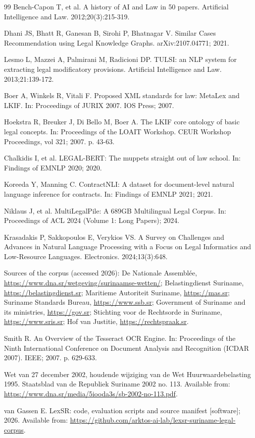 \documentclass{IOS-Book-Article}
\begin{document}
\begin{thebibliography}{99}
Bench-Capon T, et al. A history of AI and Law in 50 papers. Artificial Intelligence and Law.
2012;20(3):215-319.

Dhani JS, Bhatt R, Ganesan B, Sirohi P, Bhatnagar V. Similar Cases Recommendation using Legal
Knowledge Graphs. arXiv:2107.04771; 2021.

Lesmo L, Mazzei A, Palmirani M, Radicioni DP. TULSI: an NLP system for extracting legal
modificatory provisions. Artificial Intelligence and Law. 2013;21:139-172.

Boer A, Winkels R, Vitali F. Proposed XML standards for law: MetaLex and LKIF. In:
Proceedings of JURIX 2007. IOS Press; 2007.

Hoekstra R, Breuker J, Di Bello M, Boer A. The LKIF core ontology of basic legal concepts. In:
Proceedings of the LOAIT Workshop. CEUR Workshop Proceedings, vol 321; 2007. p. 43-63.

Chalkidis I, et al. LEGAL-BERT: The muppets straight out of law school. In: Findings of
EMNLP 2020; 2020.

Koreeda Y, Manning C. ContractNLI: A dataset for document-level natural language inference
for contracts. In: Findings of EMNLP 2021; 2021.

Niklaus J, et al. MultiLegalPile: A 689GB Multilingual Legal Corpus. In: Proceedings of ACL
2024 (Volume 1: Long Papers); 2024.

Krasadakis P, Sakkopoulos E, Verykios VS. A Survey on Challenges and Advances in Natural
Language Processing with a Focus on Legal Informatics and Low-Resource Languages.
Electronics. 2024;13(3):648.

Sources of the corpus (accessed 2026): De Nationale Assembl\'{e}e,
\url{https://www.dna.sr/wetgeving/surinaamse-wetten/}; Belastingdienst Suriname,
\url{https://belastingdienst.sr}; Maritieme Autoriteit Suriname, \url{https://mas.sr};
Suriname Standards Bureau, \url{https://www.ssb.sr}; Government of Suriname and its
ministries, \url{https://gov.sr}; Stichting voor de Rechtsorde in Suriname,
\url{https://www.sris.sr}; Hof van Justitie, \url{https://rechtspraak.sr}.

Smith R. An Overview of the Tesseract OCR Engine. In: Proceedings of the Ninth
International Conference on Document Analysis and Recognition (ICDAR 2007). IEEE; 2007.
p. 629-633.

Wet van 27 december 2002, houdende wijziging van de Wet Huurwaardebelasting 1995.
Staatsblad van de Republiek Suriname 2002 no. 113. Available from:
\url{https://www.dna.sr/media/5iooda3s/sb-2002-no-113.pdf}.

van Gassen E. LexSR: code, evaluation scripts and source manifest [software]; 2026.
Available from: \url{https://github.com/arktos-ai-lab/lexsr-suriname-legal-corpus}.

\end{thebibliography}
\end{document}
